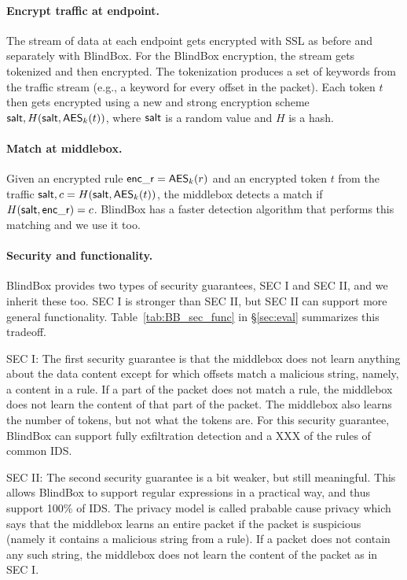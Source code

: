 \paragraph{Encrypt traffic at endpoint.}
The stream of data at each endpoint gets encrypted with SSL as before 
and separately with BlindBox. 
For the BlindBox encryption, the stream gets tokenized and then encrypted. 
The tokenization produces a set of keywords from the traffic stream (e.g.,
a keyword for every offset in the packet). Each token $t$ then gets encrypted using
a new and strong encryption scheme $\mathsf{salt}, H(\mathsf{salt}, \mathsf{AES}_k(t))$, where 
$\mathsf{salt}$ is a random value and $H$ is a hash. 

\paragraph{Match at middlebox.} 
Given an encrypted rule $\mathsf{enc\_r} = \mathsf{AES}_k(r)$ and an encrypted token $t$ from the traffic
$\mathsf{salt}, c = H(\mathsf{salt}, \mathsf{AES}_k(t))$, the middlebox detects a match if $H(\mathsf{salt}, \mathsf{enc\_r}) = c$. 
BlindBox has a faster detection algorithm that performs this matching and we use it too.


\paragraph{Security and functionality.}
BlindBox provides two types of security guarantees, SEC I and SEC II,  and we inherit these too. 
SEC I is stronger than SEC II, but SEC II can support more general functionality. 
Table~\ref{tab:BB_sec_func} in \S\ref{sec:eval} summarizes this tradeoff. 

SEC I: The first security guarantee is that the middlebox does not learn anything about the data
content except for which offsets match a malicious string, namely, a content in a rule. 
If a part of the packet does not match a rule, the middlebox does not learn the content 
of that part of the packet. The middlebox also learns the number of tokens, but not what
the tokens are. For this security guarantee, BlindBox can support fully exfiltration 
detection and a XXX of the rules of common IDS. 

SEC II: The second security guarantee is a bit weaker, but still meaningful. This allows BlindBox
to support regular expressions in a practical way, and thus support 100\% of IDS. 
The privacy model is called prabable cause privacy which says that the middlebox
learns an entire packet if the packet is suspicious (namely it contains a  malicious string from a rule). 
If a packet does not contain any such string, the middlebox does not learn the content of the packet as 
in SEC I. 

